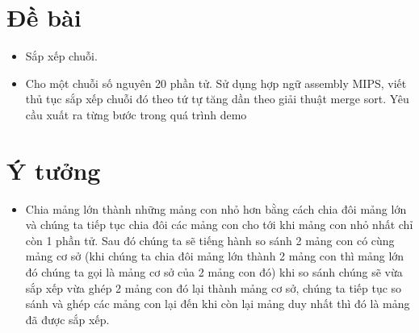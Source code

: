 \documentclass[a4paper]{article}
\begin{document}
\section{ Đề bài}
\begin{itemize}
	\item Sắp xếp chuỗi.
	\item Cho một chuỗi số nguyên 20 phần tử. Sử dụng hợp ngữ
	      assembly MIPS, viết thủ tục sắp xếp chuỗi đó theo tứ tự
	      tăng dần theo giải thuật merge sort. Yêu cầu xuất ra
	      từng bước trong quá trình demo
\end{itemize}

\section{Ý tưởng}
\begin{itemize}
	\item Chia mảng lớn thành những mảng con nhỏ hơn bằng cách chia đôi mảng lớn và chúng ta tiếp tục chia đôi các mảng con cho tới khi mảng con nhỏ nhất chỉ còn 1 phần tử. Sau đó chúng ta sẽ tiếng hành so sánh 2 mảng con có cùng mảng cơ sở (khi chúng ta chia đôi mảng lớn thành 2 mảng con thì mảng lớn đó chúng ta gọi là mảng cơ sở của 2 mảng con đó) khi so sánh chúng sẽ vừa sắp xếp vừa ghép 2 mảng con đó lại thành mảng cơ sở, chúng ta tiếp tục so sánh và ghép các mảng con lại đến khi còn lại mảng duy nhất thì đó là mảng đã được sắp xếp.
\end{itemize}
\end{document}
